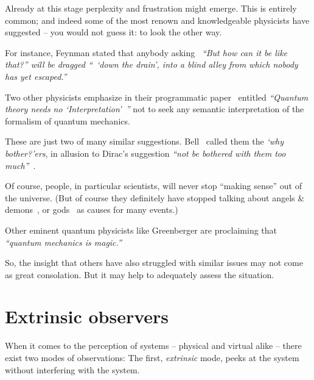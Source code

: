 Already at this stage perplexity and frustration might emerge.
This is entirely common; and indeed some of the most renown and knowledgeable physicists have suggested
-- you would not guess it: to look the other way.

For instance, Feynman stated that anybody asking~\cite[p.~129]{feynman-law} {\em ``But how can it be like that?'' will be dragged
``~`down the drain', into a blind alley from which nobody has yet escaped.''}

Two other physicists emphasize in their programmatic paper~\cite{fuchs-peres} entitled
{\em ``Quantum theory needs no `Interpretation'~''
}
not to seek any semantic interpretation of the formalism of quantum mechanics.

These are just two of many similar suggestions. Bell~\cite{bell-a} called them the
{\em `why bother?'ers}, in allusion to Dirac's suggestion
{\em ``not be bothered with them too much''}~\cite{dirac-noworries}.

Of course, people, in particular scientists, will never stop ``making sense'' out of the universe.
(But of course they definitely have stopped talking about angels \& demons~\cite{Harris-1974}, or gods~\cite{Veyne-Greek-Mythology}
as causes for many events.)

Other eminent quantum physicists like Greenberger are proclaiming that {\em ``quantum mechanics is magic.''}

So, the insight that others have also struggled with similar issues may not come as great consolation.
But it may help to adequately assess the situation.



\section{Extrinsic observers}

When it comes to the perception of systems -- physical and virtual alike --
there exist two modes of observations:
The first, {\em extrinsic} mode, peeks at the system without interfering with the system.

